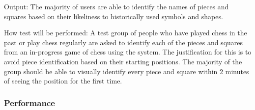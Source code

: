 \documentclass[12pt, titlepage]{article}
\begin{document}
\begin{enumerate}
        Output: The majority of users are able to identify the names of pieces and squares based on their likeliness to historically used symbols and shapes.
                            
        How test will be performed: A test group of people who have played chess in the past or play chess regularly are asked to identify each of the pieces 
            and squares from an in-progress game of chess using the system. The justification for this is to avoid piece identification based on their starting 
            positions. The majority of the group should be able to visually identify every piece and square within 2 minutes of seeing the position for the first time.
\end{enumerate}

\subsubsection{Performance}
\end{document}
